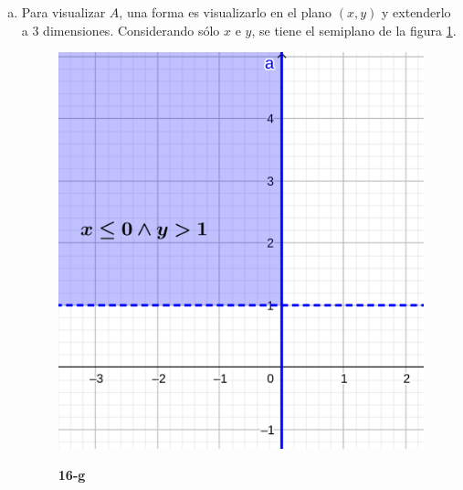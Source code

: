 \documentclass{article}
\renewcommand{\Bbb}{\mathbb}
\begin{document}
\begin{enumerate}[(a)]
\begin{equation}
\tcboxmath[colback=orange!25!white,colframe=orange]
{ 
\begin{array}{ll}
\partial{A} = & \left\{ (x,y) \in \Bbb R^2 / y = -|x|+1, -1 \leq x \leq -\frac{1}{2} \right\} \\
& \cup \left\{ (x,y) \in \Bbb R^2 / y = |x|, -\frac{1}{2} \leq x \leq \frac{1}{2} \right\} \\
& \cup \left\{ (x,y) \in \Bbb R^2 / y = -|x|+1, \frac{1}{2} \leq x \leq 1 \right\} \\
& \cup \left\{ (x,y) \in \Bbb R^2 / y = |x|-1, -1 \leq x \leq -\frac{1}{2} \right\} \\
& \cup \left\{ (x,y) \in \Bbb R^2 / y = -|x|, -\frac{1}{2} \leq x \leq \frac{1}{2} \right\} \\
& \cup \left\{ (x,y) \in \Bbb R^2 / y = |x|-1, \frac{1}{2} \leq x \leq 1 \right\} \\
\end{array}
}
\end{equation}

\item Para visualizar $A$, una forma es visualizarlo en el plano $(x, y)$ y extenderlo a 3 dimensiones. Considerando sólo $x$ e $y$, se tiene el semiplano de la figura \ref{fig:1-16-g}. 

\begin{figure}[ht]
\caption{\textbf{16-g}}
\includegraphics[scale=1]{img/ejercicios/1/16-g.png} 
\centering
\label{fig:1-16-g}
\end{figure}


\end{enumerate}
\end{document}
